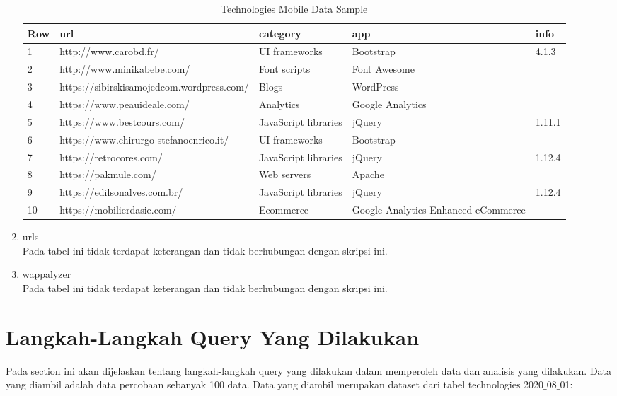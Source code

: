 \begin{enumerate}
\begin{table}[H]
	\centering
	\begin{tabular}{|l|l|p{3cm}|p{3cm}|l|}
		\hline
		\textbf{Row} & \textbf{url} & \textbf{category} & app & info\\
		\hline
		1 & http://www.carobd.fr/ & UI frameworks & Bootstrap & 4.1.3\\
		\hline
		2 & http://www.minikabebe.com/ & Font scripts & Font Awesome & \\
		\hline
		3 & https://sibirskisamojedcom.wordpress.com/ & Blogs & WordPress & \\
		\hline
		4 & https://www.peauideale.com/ & Analytics & Google Analytics & \\
		\hline
		5 & https://www.bestcours.com/ & JavaScript libraries & jQuery & 1.11.1\\
		\hline
		6 & https://www.chirurgo-stefanoenrico.it/ & UI frameworks & Bootstrap & \\
		\hline
		7 & https://retrocores.com/ & JavaScript libraries & jQuery & 1.12.4\\
		\hline
		8 & https://pakmule.com/ & Web servers & Apache & \\
		\hline
		9 & https://edilsonalves.com.br/ & JavaScript libraries & jQuery & 1.12.4\\
		\hline
		10 & https://mobilierdasie.com/ & Ecommerce & Google Analytics Enhanced eCommerce & \\
		\hline
	\end{tabular}
	\caption{Technologies Mobile Data Sample}
	\label{table:ct_tech_mobile}
\end{table}


\item urls\\
Pada tabel ini tidak terdapat keterangan dan tidak berhubungan dengan skripsi ini.
\item wappalyzer\\
Pada tabel ini tidak terdapat keterangan dan tidak berhubungan dengan skripsi ini.
\end{enumerate}

\section{Langkah-Langkah Query Yang Dilakukan}
Pada section ini akan dijelaskan tentang langkah-langkah query yang dilakukan dalam memperoleh data dan analisis yang dilakukan. Data yang diambil adalah data percobaan sebanyak 100 data. Data yang diambil merupakan dataset dari tabel technologies 2020$\_$08$\_$01:

